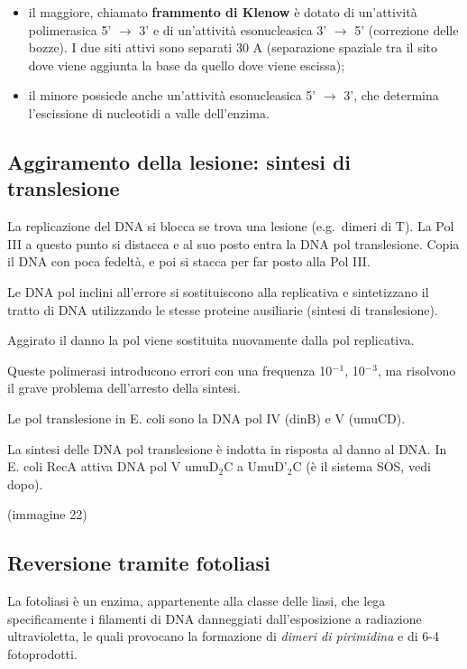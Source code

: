 \documentclass[11pt]{book}
\begin{document}
\begin{itemize}
\itemsep1pt\parskip0pt
\item
  il maggiore, chiamato \textbf{frammento di Klenow} è dotato di
  un'attività polimerasica 5' \(\rightarrow\) 3' e di un'attività
  esonucleasica 3' \(\rightarrow\) 5' (correzione delle bozze). I due
  siti attivi sono separati 30 A (separazione spaziale tra il sito dove
  viene aggiunta la base da quello dove viene escissa);
\item
  il minore possiede anche un'attività esonucleasica 5' \(\rightarrow\)
  3', che determina l'escissione di nucleotidi a valle dell'enzima.
\end{itemize}

\subsection{Aggiramento della lesione: sintesi di
translesione}\label{aggiramento-della-lesione-sintesi-di-translesione}

La replicazione del DNA si blocca se trova una lesione (e.g.~dimeri di
T). La Pol III a questo punto si distacca e al suo posto entra la DNA
pol translesione. Copia il DNA con poca fedeltà, e poi si stacca per far
posto alla Pol III.

Le DNA pol inclini all'errore si sostituiscono alla replicativa e
sintetizzano il tratto di DNA utilizzando le stesse proteine ausiliarie
(sintesi di translesione).

Aggirato il danno la pol viene sostituita nuovamente dalla pol
replicativa.

Queste polimerasi introducono errori con una frequenza 10\(^-\)\(^1\),
10\(^-\)\(^3\), ma risolvono il grave problema dell'arresto della
sintesi.

Le pol translesione in E. coli sono la DNA pol IV (dinB) e V (umuCD).

La sintesi delle DNA pol translesione è indotta in risposta al danno al
DNA. In E. coli RecA attiva DNA pol V umuD\(_2\)C a UmuD'\(_2\)C (è il
sistema SOS, vedi dopo).

(immagine 22)

\subsection{Reversione tramite
fotoliasi}\label{reversione-tramite-fotoliasi}

La fotoliasi è un enzima, appartenente alla classe delle liasi, che lega
specificamente i filamenti di DNA danneggiati dall'esposizione a
radiazione ultravioletta, le quali provocano la formazione di
\emph{dimeri di pirimidina} e di 6-4 fotoprodotti.
\end{document}
